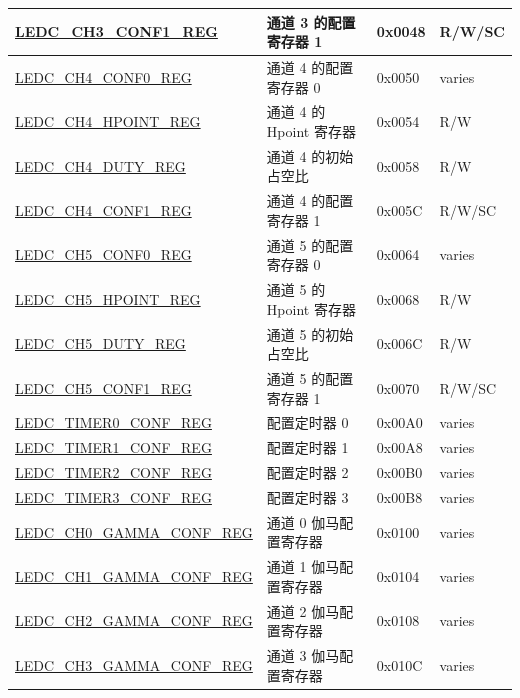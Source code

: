 \begin{longtable}{ | p{5.5cm} | p{6.8cm} | p{1.3cm} | p{2cm} | }
    \hyperref[regdesc:LEDCCHNCONF1REG]{LEDC\_CH3\_CONF1\_REG} & 通道 3 的配置寄存器 1 & 0x0048 & R/W/SC \\ \hline
    \hyperref[regdesc:LEDCCHNCONF0REG]{LEDC\_CH4\_CONF0\_REG} & 通道 4 的配置寄存器 0 & 0x0050 & varies \\ \hline
    \hyperref[regdesc:LEDCCHNHPOINTREG]{LEDC\_CH4\_HPOINT\_REG} & 通道 4 的 Hpoint 寄存器 & 0x0054 & R/W \\ \hline
    \hyperref[regdesc:LEDCCHNDUTYREG]{LEDC\_CH4\_DUTY\_REG} & 通道 4 的初始占空比 & 0x0058 & R/W \\ \hline
    \hyperref[regdesc:LEDCCHNCONF1REG]{LEDC\_CH4\_CONF1\_REG} & 通道 4 的配置寄存器 1 & 0x005C & R/W/SC \\ \hline
    \hyperref[regdesc:LEDCCHNCONF0REG]{LEDC\_CH5\_CONF0\_REG} & 通道 5 的配置寄存器 0 & 0x0064 & varies \\ \hline
    \hyperref[regdesc:LEDCCHNHPOINTREG]{LEDC\_CH5\_HPOINT\_REG} & 通道 5 的 Hpoint 寄存器 & 0x0068 & R/W \\ \hline
    \hyperref[regdesc:LEDCCHNDUTYREG]{LEDC\_CH5\_DUTY\_REG} & 通道 5 的初始占空比 & 0x006C & R/W \\ \hline
    \hyperref[regdesc:LEDCCHNCONF1REG]{LEDC\_CH5\_CONF1\_REG} & 通道 5 的配置寄存器 1 & 0x0070 & R/W/SC \\ \hline
    \hyperref[regdesc:LEDCTIMERNCONFREG]{LEDC\_TIMER0\_CONF\_REG} & 配置定时器 0 & 0x00A0 & varies \\ \hline
    \hyperref[regdesc:LEDCTIMERNCONFREG]{LEDC\_TIMER1\_CONF\_REG} & 配置定时器 1 & 0x00A8 & varies \\ \hline
    \hyperref[regdesc:LEDCTIMERNCONFREG]{LEDC\_TIMER2\_CONF\_REG} & 配置定时器 2 & 0x00B0 & varies \\ \hline
    \hyperref[regdesc:LEDCTIMERNCONFREG]{LEDC\_TIMER3\_CONF\_REG} & 配置定时器 3 & 0x00B8 & varies \\ \hline
    \hyperref[regdesc:LEDCCHNGAMMACONFREG]{LEDC\_CH0\_GAMMA\_CONF\_REG} & 通道 0 伽马配置寄存器 & 0x0100 & varies \\ \hline
    \hyperref[regdesc:LEDCCHNGAMMACONFREG]{LEDC\_CH1\_GAMMA\_CONF\_REG} & 通道 1 伽马配置寄存器 & 0x0104 & varies \\ \hline
    \hyperref[regdesc:LEDCCHNGAMMACONFREG]{LEDC\_CH2\_GAMMA\_CONF\_REG} & 通道 2 伽马配置寄存器 & 0x0108 & varies \\ \hline
    \hyperref[regdesc:LEDCCHNGAMMACONFREG]{LEDC\_CH3\_GAMMA\_CONF\_REG} & 通道 3 伽马配置寄存器 & 0x010C & varies \\ \hline

\end{longtable}
